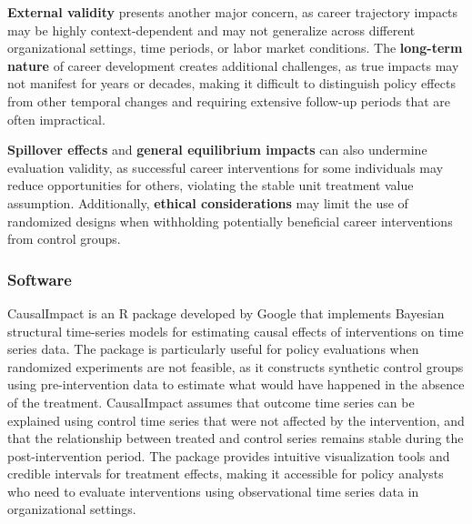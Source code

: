 \documentclass[main.tex]{subfiles}
\begin{document}
\textbf{External validity} presents another major concern, as career trajectory impacts may be highly context-dependent and may not generalize across different organizational settings, time periods, or labor market conditions\parencite{impact_eval_methods,quasi_exp_worldbank}. The \textbf{long-term nature} of career development creates additional challenges, as true impacts may not manifest for years or decades, making it difficult to distinguish policy effects from other temporal changes and requiring extensive follow-up periods that are often impractical\parencite{quasi_experimental}.

\textbf{Spillover effects} and \textbf{general equilibrium impacts} can also undermine evaluation validity, as successful career interventions for some individuals may reduce opportunities for others, violating the stable unit treatment value assumption\parencite{quasi_exp_worldbank}. Additionally, \textbf{ethical considerations} may limit the use of randomized designs when withholding potentially beneficial career interventions from control groups\parencite{impact_eval_glossary,quasi_exp_worldbank}.

\subsubsection{Software}


CausalImpact is an R package developed by Google that implements Bayesian structural time-series models for estimating causal effects of interventions on time series data\parencite{causal_impact}. The package is particularly useful for policy evaluations when randomized experiments are not feasible, as it constructs synthetic control groups using pre-intervention data to estimate what would have happened in the absence of the treatment. CausalImpact assumes that outcome time series can be explained using control time series that were not affected by the intervention, and that the relationship between treated and control series remains stable during the post-intervention period. The package provides intuitive visualization tools and credible intervals for treatment effects, making it accessible for policy analysts who need to evaluate interventions using observational time series data in organizational settings.

\end{document}
